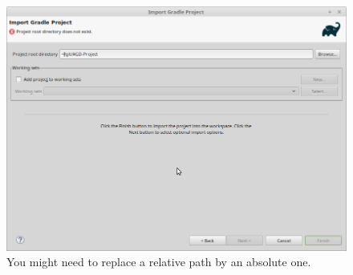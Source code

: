 \begin{figure}
	\includegraphics[width=\textwidth]{setup-parts/pictures/eclipse-import-4a.png}
	\caption{You might need to replace a relative path by an absolute one.}
\end{figure}

